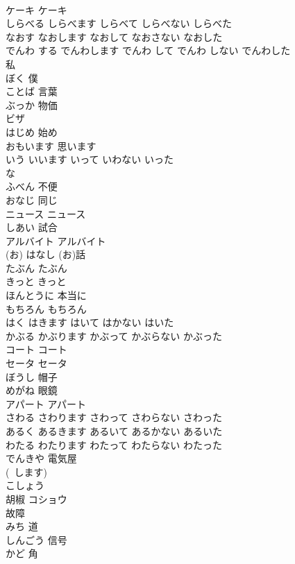 \documentclass[8pt]{extreport}
\begin{document}
\begin{CJK}{UTF8}{min}
\\	ケーキ	ケーキ
\\	しらべる	しらべます	しらべて	しらべない	しらべた	
\\	なおす	なおします	なおして	なおさない	なおした	
\\	でんわ する	でんわします	でんわ して	でんわ しない	でんわした	
\\	私 
\\	ぼく	僕
\\	ことば	言葉
\\	ぶっか	物価
\\	ビザ	
\\	はじめ	始め
\\	おもいます	思います
\\	いう	いいます	いって	いわない	いった	
\\	な 
\\	ふべん	不便
\\	おなじ	同じ
\\	ニュース	ニュース
\\	しあい	試合
\\	アルバイト	アルバイト
\\	(お) はなし	(お)話
\\	たぶん	たぶん
\\	きっと	きっと
\\	ほんとうに	本当に
\\	もちろん	もちろん
\\	はく	はきます	はいて	はかない	はいた	
\\	かぶる	かぶります	かぶって	かぶらない	かぶった	
\\	コート	コート
\\	セータ	セータ
\\	ぼうし	帽子
\\	めがね	眼鏡
\\	アパート	アパート
\\	さわる	さわります	さわって	さわらない	さわった	
\\	あるく	あるきます	あるいて	あるかない	あるいた	
\\	わたる	わたります	わたって	わたらない	わたった	
\\	でんきや	電気屋
\\	(~します)	
\\	こしょう	
\\	胡椒 コショウ 
\\	故障
\\	みち	道
\\	しんごう	信号
\\	かど	角

\end{CJK}
\end{document}
